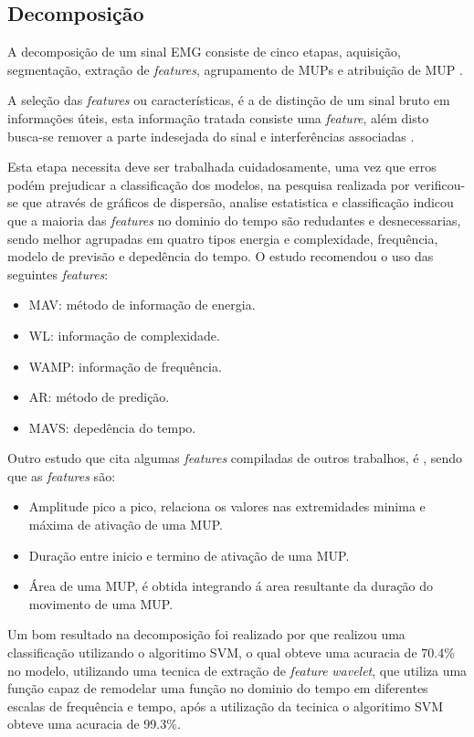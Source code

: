 \subsection{Decomposição}
A decomposição de um sinal EMG consiste de cinco etapas, aquisição, segmentação, extração de \textit{features}, agrupamento de MUPs e atribuição de MUP \cite{yousefi2014characterizing}.

A seleção das \textit{features} ou características, é a de distinção de um sinal bruto em informações úteis, esta informação tratada consiste uma \textit{feature}, além disto busca-se remover a parte indesejada do sinal e interferências associadas \cite{phinyomark2012feature}.

Esta etapa necessita deve ser trabalhada cuidadosamente, uma vez que erros podém prejudicar a classificação dos modelos, na pesquisa realizada por \cite{phinyomark2012feature} verificou-se que através de gráficos de dispersão, analise estatistica e classificação indicou que a maioria das \textit{features} no dominio do tempo são redudantes e desnecessarias, sendo melhor agrupadas em quatro tipos energia e complexidade, frequência, modelo de previsão e depedência do tempo. O estudo recomendou o uso das seguintes \textit{features}:

\begin{itemize}
    \item MAV: método de informação de energia.
    \item WL: informação de complexidade.
    \item WAMP: informação de frequência.
    \item AR: método de predição.
    \item MAVS: depedência  do tempo.
\end{itemize}

Outro estudo que cita algumas \textit{features} compiladas de outros trabalhos,     é \cite{yousefi2014characterizing}, sendo que as \textit{features} são:
\begin{itemize}
    \item Amplitude pico a pico, relaciona os valores nas extremidades minima e máxima de ativação de uma MUP.
    \item Duração entre inicio e termino de ativação de uma MUP.
    \item Área de uma MUP, é obtida integrando á area resultante da duração do movimento de uma MUP.
\end{itemize}

Um bom resultado na decomposição foi realizado por \cite{yousefi2014characterizing} que realizou uma classificação utilizando o algoritimo SVM, o qual obteve uma acuracia de 70.4\% no modelo, utilizando uma tecnica de extração de \textit{feature} \textit{wavelet}, que utiliza uma função capaz de remodelar uma função no dominio do tempo em diferentes escalas de frequência e tempo, após a utilização da tecinica o algoritimo SVM obteve uma acuracia de 99.3\%.

